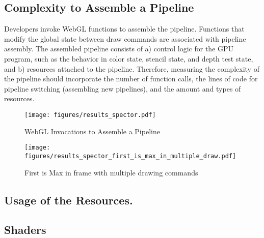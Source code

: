 \subsection{Complexity to Assemble a Pipeline}

Developers invoke WebGL functions to assemble the pipeline. Functions that modify the global state between draw commands are associated with pipeline assembly. The assembled pipeline consists of a) control logic for the GPU program, such as the behavior in color state, stencil state, and depth test state, and b) resources attached to the pipeline. Therefore, measuring the complexity of the pipeline should incorporate the number of function calls, the lines of code for pipeline switching (assembling new pipelines), and the amount and types of resources.

\begin{figure}[tp]
\centering
\texttt{[image: figures/results\_spector.pdf]}
\caption{WebGL Invocations to Assemble a Pipeline}\label{fig_results_spector}
\end{figure}

\begin{figure}[tp]
\centering
\texttt{[image: figures/results\_spector\_first\_is\_max\_in\_multiple\_draw.pdf]}
\caption{First is Max in frame with multiple drawing commands}\label{fig_results_spector_first_is_max_in_multiple_draw}
\end{figure}




\subsection{Usage of the Resources.} %



\subsection{Shaders}


